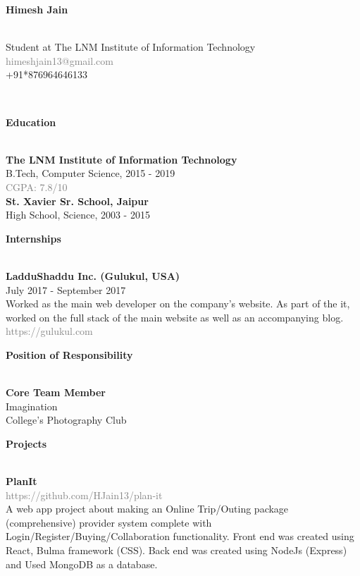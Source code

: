 \documentclass[12pt]{article}
\newcommand{\mybox}[1]{\par\noindent\colorbox{shadecolor}
{\parbox{\dimexpr\textwidth-2\fboxsep\relax}{#1}}}
\begin{document}
\begin{LARGE}
\noindent\textbf{Himesh Jain}
\end{LARGE}\\
Student at The LNM Institute of Information Technology\\
\textcolor{gray}{himeshjain13@gmail.com}\\
+91*876964646133

\noindent\hrulefill \\
\begin{large}
\mybox{\textbf{Education}}
\end{large}
\\
\textbf{The LNM Institute of Information Technology}\\
B.Tech, Computer Science, 2015 - 2019\\
\textcolor{gray}{CGPA: 7.8/10}\\
\textbf{St. Xavier Sr. School, Jaipur}\\
High School, Science, 2003 - 2015\\
\hrulefill
\begin{large}
\mybox{\textbf{Internships}}
\end{large}
\\
\textbf{LadduShaddu Inc. (Gulukul, USA)}\\
July 2017 - September 2017\\
Worked as the main web developer on the company's website. As part of the it, worked on the full stack of the main website as well as an accompanying blog.\\
\textcolor{gray}{https://gulukul.com}\\
\hrulefill
\begin{large}
\mybox{\textbf{Position of Responsibility}}
\end{large}
\\
\textbf{Core Team Member}\\
Imagination\\
College's Photography Club\\
\hrulefill
\begin{large}
\mybox{\textbf{Projects}}
\end{large}
\\
\textbf{PlanIt}\\
\textcolor{gray}{https://github.com/HJain13/plan-it}\\
A web app project about making an Online Trip/Outing package (comprehensive) provider system  complete with Login/Register/Buying/Collaboration functionality. Front end was created using React, Bulma framework (CSS). Back end was created using NodeJs (Express) and Used MongoDB as a database.\\
\end{document}
